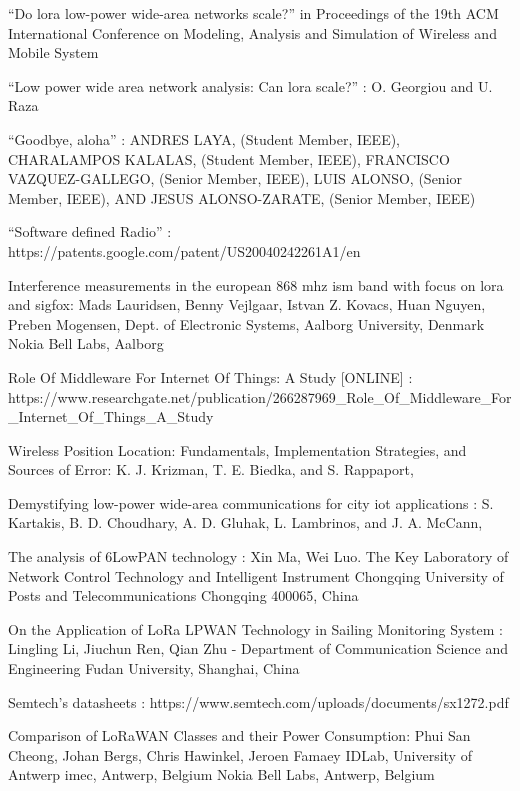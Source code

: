 \documentclass[12pt,a4paper,openright,twoside]{report}
\begin{document}
\begin{thebibliography}{90}
 ``Do lora low-power wide-area networks scale?'' in Proceedings of the 19th
ACM International Conference on Modeling, Analysis and Simulation
of Wireless and Mobile System 

 ``Low power wide area network analysis: Can lora scale?'' : O. Georgiou and U. Raza


 ``Goodbye, aloha'' : ANDRES LAYA, (Student Member, IEEE), CHARALAMPOS KALALAS, (Student Member, IEEE), FRANCISCO VAZQUEZ-GALLEGO, (Senior Member, IEEE), LUIS ALONSO, (Senior Member, IEEE), AND JESUS ALONSO-ZARATE, (Senior Member, IEEE)

 ``Software defined Radio'' :  https://patents.google.com/patent/US20040242261A1/en

 Interference measurements in the european 868 mhz ism band with focus on lora and sigfox: Mads Lauridsen, Benny Vejlgaar, Istvan Z. Kovacs, Huan Nguyen, Preben Mogensen, Dept. of Electronic Systems, Aalborg University, Denmark Nokia Bell Labs, Aalborg

 Role Of Middleware For Internet Of Things: A Study [ONLINE] : 
https://www.researchgate.net/publication/266287969\_Role\_Of\_Middleware\_For\_Internet\_Of\_Things\_A\_Study
				
 Wireless Position Location: Fundamentals, Implementation Strategies, and Sources of Error: K. J. Krizman, T. E. Biedka, and S. Rappaport,

 Demystifying low-power wide-area communications for city iot applications : 
S. Kartakis, B. D. Choudhary, A. D. Gluhak, L. Lambrinos, and J. A. McCann,

 The analysis of 6LowPAN technology : Xin Ma, Wei Luo. The Key Laboratory of Network Control Technology and Intelligent Instrument Chongqing University of Posts and Telecommunications Chongqing 400065, China

On the Application of LoRa LPWAN Technology in Sailing Monitoring System : 	
Lingling Li, Jiuchun Ren, Qian Zhu - Department of Communication Science and Engineering
Fudan University, Shanghai, China

 Semtech's datasheets : https://www.semtech.com/uploads/documents/sx1272.pdf

 Comparison of LoRaWAN Classes and their Power Consumption: Phui San Cheong, Johan Bergs, Chris Hawinkel, Jeroen Famaey IDLab, University of Antwerp imec, Antwerp, Belgium Nokia Bell Labs, Antwerp, Belgium


\end{thebibliography}
\end{document}
